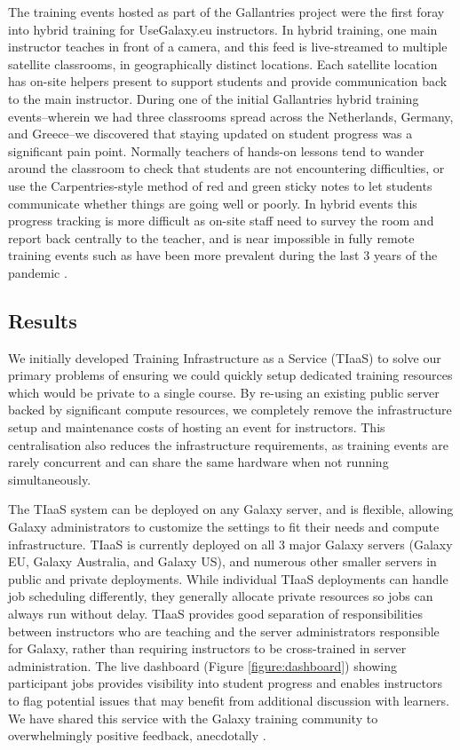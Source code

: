 \documentclass[a4paper,num-refs]{oup-contemporary}
\begin{document}
The training events hosted as part of the Gallantries project \cite{gallantries} were the first foray into hybrid training for UseGalaxy.eu instructors. In hybrid training, one main instructor teaches in front of a camera, and this feed is live-streamed to multiple satellite classrooms, in geographically distinct locations. Each satellite location has on-site helpers present to support students and provide communication back to the main instructor. During one of the initial Gallantries hybrid training events--wherein we had three classrooms spread across the Netherlands, Germany, and Greece--we discovered that staying updated on student progress was a significant pain point. Normally teachers of hands-on lessons tend to wander around the classroom to check that students are not encountering difficulties, or use the Carpentries-style \cite{thecarpentries,Wilson2016} method of red and green sticky notes to let students communicate whether things are going well or poorly. In hybrid events this progress tracking is more difficult as on-site staff need to survey the room and report back centrally to the teacher, and is near impossible in fully remote training events such as have been more prevalent during the last 3 years of the pandemic \cite{Serrano_Solano_2021}.

\subsection{Results}

We initially developed Training Infrastructure as a Service (TIaaS) to solve our primary problems of ensuring we could quickly setup dedicated training resources which would be private to a single course. By re-using an existing public server backed by significant compute resources, we completely remove the infrastructure setup and maintenance costs of hosting an event for instructors. This centralisation also reduces the infrastructure requirements, as training events are rarely concurrent and can share the same hardware when not running simultaneously. 

The TIaaS system can be deployed on any Galaxy server, and is flexible, allowing Galaxy administrators to customize the settings to fit their needs and compute infrastructure. TIaaS is currently deployed on all 3 major Galaxy servers (Galaxy EU, Galaxy Australia, and Galaxy US), and numerous other smaller servers in public and private deployments. While individual TIaaS deployments can handle job scheduling differently, they generally allocate private resources so jobs can always run without delay. TIaaS provides good separation of responsibilities between instructors who are teaching and the server administrators responsible for Galaxy, rather than requiring instructors to be cross-trained in server administration. The live dashboard (Figure \ref{figure:dashboard}) showing participant jobs provides visibility into student progress and enables instructors to flag potential issues that may benefit from additional discussion with learners. We have shared this service with the Galaxy training community to overwhelmingly positive feedback, anecdotally \cite{tiaas_feedback}.
\end{document}
